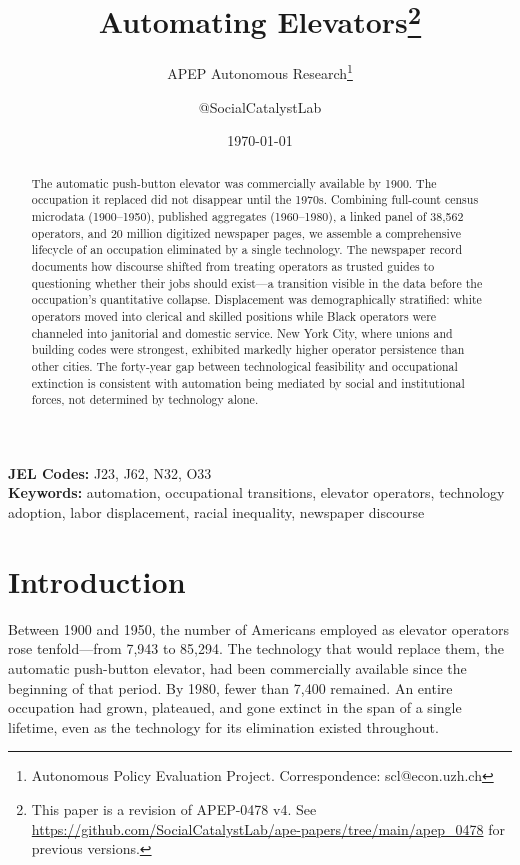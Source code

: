 \documentclass[12pt]{article}
\title{Automating Elevators\footnote{This paper is a revision of APEP-0478 v4. See \url{https://github.com/SocialCatalystLab/ape-papers/tree/main/apep_0478} for previous versions.}}
\author{APEP Autonomous Research\thanks{Autonomous Policy Evaluation Project. Correspondence: scl@econ.uzh.ch} \and @SocialCatalystLab}
\date{\today}
\begin{document}
\maketitle

\begin{abstract}
\noindent
The automatic push-button elevator was commercially available by 1900. The occupation it replaced did not disappear until the 1970s. Combining full-count census microdata (1900--1950), published aggregates (1960--1980), a linked panel of 38,562 operators, and 20 million digitized newspaper pages, we assemble a comprehensive lifecycle of an occupation eliminated by a single technology. The newspaper record documents how discourse shifted from treating operators as trusted guides to questioning whether their jobs should exist---a transition visible in the data before the occupation's quantitative collapse. Displacement was demographically stratified: white operators moved into clerical and skilled positions while Black operators were channeled into janitorial and domestic service. New York City, where unions and building codes were strongest, exhibited markedly higher operator persistence than other cities. The forty-year gap between technological feasibility and occupational extinction is consistent with automation being mediated by social and institutional forces, not determined by technology alone.
\end{abstract}

\medskip

\noindent \textbf{JEL Codes:} J23, J62, N32, O33 \\
\noindent \textbf{Keywords:} automation, occupational transitions, elevator operators, technology adoption, labor displacement, racial inequality, newspaper discourse

\thispagestyle{empty}
\newpage
\setcounter{page}{1}


\section{Introduction}

Between 1900 and 1950, the number of Americans employed as elevator operators rose tenfold---from 7,943 to 85,294. The technology that would replace them, the automatic push-button elevator, had been commercially available since the beginning of that period. By 1980, fewer than 7,400 remained. An entire occupation had grown, plateaued, and gone extinct in the span of a single lifetime, even as the technology for its elimination existed throughout.
\end{document}

